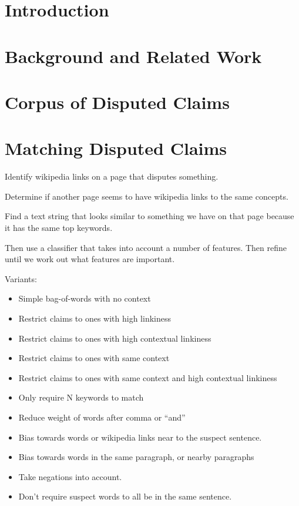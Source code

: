\documentclass{acm_proc_article-sp}
\begin{document}
\section{Introduction}

\section{Background and Related Work}

\section{Corpus of Disputed Claims}

\section{Matching Disputed Claims}

Identify wikipedia links on a page that disputes something.

Determine if another page seems to have wikipedia links to the same concepts.

Find a text string that looks similar to something we have on that page because it has the same top keywords.

Then use a classifier that takes into account a number of features. Then refine until we work out what features are important.

Variants: 
\begin{itemize}
 \item Simple bag-of-words with no context
 \item Restrict claims to ones with high linkiness
 \item Restrict claims to ones with high contextual linkiness
 \item Restrict claims to ones with same context
 \item Restrict claims to ones with same context and high contextual linkiness
 \item Only require N keywords to match
 \item Reduce weight of words after comma or ``and''
 \item Bias towards words or wikipedia links near to the suspect sentence.
 \item Bias towards words in the same paragraph, or nearby paragraphs
 \item Take negations into account.
 \item Don't require suspect words to all be in the same sentence.
\end{itemize}
\end{document}
